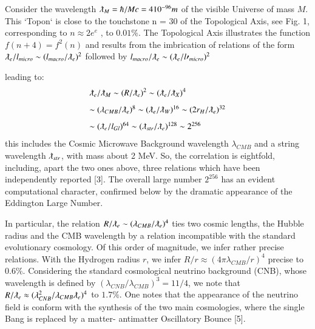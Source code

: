 \documentclass[twoside,draft]{article}
\begin{document}
\begin{sloppypar}
{Consider the wavelength $\lambdabar_{M} = \hbar /Mc = 4 10^{-96} m$ of the visible Universe of mass $M$. This `Topon` is close to the touchstone n = 30 of the Topological Axis, see Fig. 1,
corresponding to $n \approx 2e^{e}$ , to $0.01\%$. The Topological Axis illustrates the function $f(n + 4) = f^{2}(n)$
and results from the imbrication of relations of the form 
$
\lambdabar_{e} /l_{micro} \sim (l_{macro} /\lambdabar_{e})^{2}
$
followed by 
$
l_{macro} /\lambdabar_{e} \sim (\lambdabar_{e} /l\prime_{micro} )^{2}
$

leading to:
$$
\begin{array}{ll}
%
\displaystyle
\lambdabar_{e}/\lambdabar_{M} \sim (R/\lambdabar_{e})^{2} \sim (\lambdabar_{e}/ \lambdabar_{X})^{4}\\[+8pt]  %
\sim (\lambda_{CMB}/ \lambdabar_{e})^{8} \sim (\lambdabar_{e}/\lambdabar_{W})^{16} \sim (2r_{H} /\lambdabar_{e})^{32}\\[+8pt] %
\sim (\lambdabar_{e}/ l_{Gl} )^{64} \sim (\lambdabar_{str} /\lambdabar_{e} )^{128} \sim 2^{256}\\ %
\end{array}
$$
this includes the Cosmic Microwave Background wavelength $\lambda_{CMB}$ and a string wavelength $\lambdabar_{str}$, with mass about 2 MeV.  So, the correlation is eightfold,
including, apart the two ones above, three relations which have been independently reported [3].
The overall large number $2^{256}$ has an evident computational character, confirmed below by the
dramatic appearance of the Eddington Large Number.

In particular, the relation $R/\lambdabar_{e} \sim (\lambda_{CMB} / \lambdabar_{e})^{4}$ ties two cosmic lengths, the Hubble radius and the CMB wavelength by a relation incompatible with the standard evolutionary cosmology. Of this order of
magnitude, we infer rather precise relations. With the Hydrogen radius $r$, we infer $R/r \approx (4\pi \lambda_{CMB} /r)^{4}$
precise to $0.6\%$. 
Considering the standard cosmological neutrino background (CNB), whose wavelength is defined by $(\lambda_{CNB} / \lambda_{CMB})^{3} = 11/4$, we note that $R/ \lambdabar_{e} \approx
( \lambda_{CNB}^{2} / \lambda_{CMB} \lambdabar_{e} )^{4}$ to $1.7\%$.
 One notes that the appearance of the neutrino field is conform
with the synthesis of the two main cosmologies, where the single Bang is replaced by a matter-
antimatter Oscillatory Bounce [5].

}
\end{sloppypar}
\end{document}
